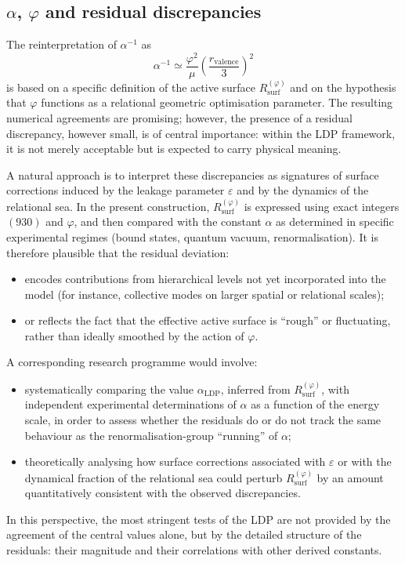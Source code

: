 \documentclass[11pt,a4paper]{article}
\begin{document}
\subsection{\texorpdfstring{\(\alpha\), \(\varphi\)}{α, φ} and residual discrepancies}
The reinterpretation of \(\alpha^{-1}\) as
\[
\alpha^{-1} \simeq \frac{\varphi^{2}}{\mu} \left(\frac{r_{\mathrm{valence}}}{3}\right)^{2}
\]
is based on a specific definition of the active surface \(R_{\mathrm{surf}}^{(\varphi)}\) and on the hypothesis that \(\varphi\) functions as a relational geometric optimisation parameter. The resulting numerical agreements are promising; however, the presence of a residual discrepancy, however small, is of central importance: within the LDP framework, it is not merely acceptable but is expected to carry physical meaning.

A natural approach is to interpret these discrepancies as signatures of surface corrections induced by the leakage parameter \(\varepsilon\) and by the dynamics of the relational sea. In the present construction, \(R_{\mathrm{surf}}^{(\varphi)}\) is expressed using exact integers \((930)\) and \(\varphi\), and then compared with the constant \(\alpha\) as determined in specific experimental regimes (bound states, quantum vacuum, renormalisation). It is therefore plausible that the residual deviation:
\begin{itemize}[label=-]
    \item encodes contributions from hierarchical levels not yet incorporated into the model (for instance, collective modes on larger spatial or relational scales);
    \item or reflects the fact that the effective active surface is “rough” or fluctuating, rather than ideally smoothed by the action of \(\varphi\).
\end{itemize}
A corresponding research programme would involve:
\begin{itemize}[label=-]
    \item systematically comparing the value \(\alpha_{\mathrm{LDP}}\), inferred from \(R_{\mathrm{surf}}^{(\varphi)}\), with independent experimental determinations of \(\alpha\) as a function of the energy scale, in order to assess whether the residuals do or do not track the same behaviour as the renormalisation-group “running” of \(\alpha\);
    \item theoretically analysing how surface corrections associated with \(\varepsilon\) or with the dynamical fraction of the relational sea could perturb \(R_{\mathrm{surf}}^{(\varphi)}\) by an amount quantitatively consistent with the observed discrepancies.
\end{itemize}
In this perspective, the most stringent tests of the LDP are not provided by the agreement of the central values alone, but by the detailed structure of the residuals: their magnitude and their correlations with other derived constants.
\end{document}
